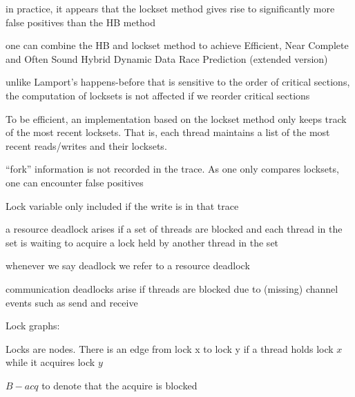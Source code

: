 \documentclass[landscape, a4paper]{article}
\begin{document}
\begin{minipage}[t]{0.2\linewidth}
\begin{betterlist}
\begin{betterlist}
			\item in practice, it appears that the lockset method gives rise to significantly \alert{more false positives} than the HB method
			\item one can combine the HB and lockset method to achieve Efficient, Near Complete and Often Sound Hybrid Dynamic Data Race Prediction (extended version)
		\end{betterlist}
		\item unlike Lamport’s happens-before that is sensitive to the order of critical sections, the computation of locksets is \alert{not affected} if we \alert{reorder critical sections}
		\item To be efficient, an implementation based on the lockset method only keeps track of the most recent locksets. That is, each thread maintains a list of the most recent reads/writes and their locksets. 
		\item \enquote{fork} information is not recorded in the trace. As one only compares locksets, one can encounter false positives
		\item Lock variable only included if the write is in that trace
	\end{betterlist}
	\begin{betterlist}
		\item a \alert{resource deadlock} arises if a set of threads are blocked and each thread in the set is waiting to acquire a lock held by another thread in the set
		\begin{betterlist}
			\item whenever we say deadlock we refer to a resource deadlock
		\end{betterlist}
		\item \alert{communication deadlocks} arise if threads are blocked due to (missing) channel events such as send and receive
		\item \alert{Lock graphs}:
		\begin{betterlist}
			\item {} Locks are nodes. There is an edge from lock x to lock y if a thread holds lock $x$ while it acquires lock $y$
			\begin{betterlist}
				\item $B-acq$ to denote that the acquire is blocked
			\end{betterlist}


\end{betterlist}
\end{betterlist}
\end{minipage}
\end{document}
